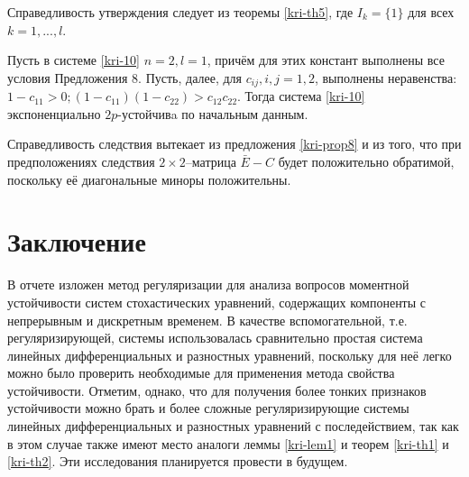 Справедливость утверждения следует из теоремы \ref{kri-th5}, где $I_k = \{1\}$
для всех $k = 1, ..., l$.

\begin{corollary}\label{kri-cor2}
 Пусть в системе \eqref{kri-10} $n = 2, l =1$, причём для этих констант выполнены все условия Предложения 8. Пусть, далее, для $c_{ij}, i,j = 1, 2$, выполнены неравенства: $ 1 - c_{11} > 0; (1 - c_{11})(1 - c_{22}) > c_{12}c_{22}$. Тогда система \eqref{kri-10}
экспоненциально $2p$-устойчивa по начальным данным.
\end{corollary}

Справедливость следствия вытекает из предложения \ref{kri-prop8} и из того, что при
предположениях следствия $2\times 2$--матрица $\bar E - C$ будет
положительно обратимой, поскольку её диагональные миноры
положительны.

\section{Заключение} В отчете изложен метод регуляризации для
анализа вопросов моментной устойчивости систем стохастических
уравнений, содержащих компоненты с непрерывным и дискретным
временем. В качестве вспомогательной, т.е. регуляризирующей, системы
использовалась сравнительно простая система линейных
дифференциальных и разностных уравнений, поскольку для неё легко
можно было проверить необходимые для применения метода свойства
устойчивости. Отметим, однако, что для получения более тонких
признаков устойчивости можно брать и более сложные регуляризирующие
системы линейных дифференциальных и разностных уравнений с
последействием, так как в этом случае также имеют место аналоги
леммы \ref{kri-lem1} и теорем \ref{kri-th1} и \ref{kri-th2}. Эти исследования
планируется провести в будущем.





%
